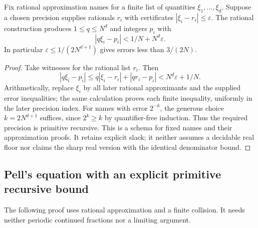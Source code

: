 \begin{theorem}\label{dio:real-transfer}
Fix rational approximation names for a finite list of quantities
$\xi_1,\ldots,\xi_d$. Suppose a chosen precision supplies rationals
$r_i$ with certificates $|\xi_i-r_i|\leq\varepsilon$.
The rational construction produces $1\leq q\leq N^d$ and integers
$p_i$ with
\[
 |q\xi_i-p_i|<1/N+N^d\varepsilon.
\]
In particular $\varepsilon\leq1/(2N^{d+1})$ gives errors
less than $3/(2N)$.
\end{theorem}
\begin{proof}
Take witnesses for the rational list $r_i$. Then
\[
 |q\xi_i-p_i|\leq q|\xi_i-r_i|+|qr_i-p_i|
 <N^d\varepsilon+1/N.
\]
Arithmetically, replace $\xi_i$ by all later rational approximants and
the supplied error inequalities; the same calculation proves each
finite inequality, uniformly in the later precision index.
For names with error $2^{-k}$, the generous choice $k=2N^{d+1}$
suffices, since $2^k\geq k$ by quantifier-free induction.
Thus the required precision is primitive recursive.
This is a schema for fixed names and their approximation proofs.
It retains explicit slack; it neither assumes a decidable real floor
nor claims the sharp real version with the identical denominator bound.
\end{proof}

\subsection{Pell's equation with an explicit primitive recursive bound}

The following proof uses rational approximation and a finite collision.
It needs neither periodic continued fractions nor a limiting argument.

